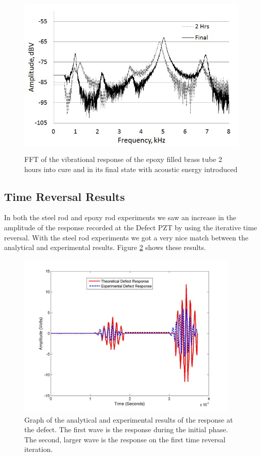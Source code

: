 \documentclass[]{aiaa-tc}%
\begin{document}
\begin{figure}[H]%
\centering
 \includegraphics[height = 8cm]{epoxy_fft_sound}
 \caption{FFT of the vibrational response of the epoxy filled brass tube 2 hours into cure and in its final state with acoustic energy introduced}
 \label{fig:epoxy_fft_sound}
\end{figure}

\subsection{Time Reversal Results}

In both the steel rod and epoxy rod experiments we saw an increase in the amplitude of the response recorded at the Defect PZT by using the iterative time reversal. With the steel rod experiments we got a very nice match between the analytical and experimental results. Figure \ref{fig:tr_steel1} shows these results. 

\begin{figure}[H]%
\centering
 \includegraphics[height = 8cm]{tr_steel1}
 \caption{Graph of the analytical and experimental results of the response at the defect. The first wave is the response during the initial phase. The second, larger wave is the response on the first time reversal iteration.}
 \label{fig:tr_steel1}
\end{figure}
\end{document}

